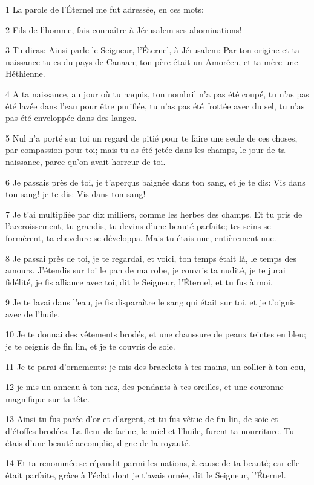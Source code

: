 \par 1 La parole de l'Éternel me fut adressée, en ces mots:
\par 2 Fils de l'homme, fais connaître à Jérusalem ses abominations!
\par 3 Tu diras: Ainsi parle le Seigneur, l'Éternel, à Jérusalem: Par ton origine et ta naissance tu es du pays de Canaan; ton père était un Amoréen, et ta mère une Héthienne.
\par 4 A ta naissance, au jour où tu naquis, ton nombril n'a pas été coupé, tu n'as pas été lavée dans l'eau pour être purifiée, tu n'as pas été frottée avec du sel, tu n'as pas été enveloppée dans des langes.
\par 5 Nul n'a porté sur toi un regard de pitié pour te faire une seule de ces choses, par compassion pour toi; mais tu as été jetée dans les champs, le jour de ta naissance, parce qu'on avait horreur de toi.
\par 6 Je passais près de toi, je t'aperçus baignée dans ton sang, et je te dis: Vis dans ton sang! je te dis: Vis dans ton sang!
\par 7 Je t'ai multipliée par dix milliers, comme les herbes des champs. Et tu pris de l'accroissement, tu grandis, tu devins d'une beauté parfaite; tes seins se formèrent, ta chevelure se développa. Mais tu étais nue, entièrement nue.
\par 8 Je passai près de toi, je te regardai, et voici, ton temps était là, le temps des amours. J'étendis sur toi le pan de ma robe, je couvris ta nudité, je te jurai fidélité, je fis alliance avec toi, dit le Seigneur, l'Éternel, et tu fus à moi.
\par 9 Je te lavai dans l'eau, je fis disparaître le sang qui était sur toi, et je t'oignis avec de l'huile.
\par 10 Je te donnai des vêtements brodés, et une chaussure de peaux teintes en bleu; je te ceignis de fin lin, et je te couvris de soie.
\par 11 Je te parai d'ornements: je mis des bracelets à tes mains, un collier à ton cou,
\par 12 je mis un anneau à ton nez, des pendants à tes oreilles, et une couronne magnifique sur ta tête.
\par 13 Ainsi tu fus parée d'or et d'argent, et tu fus vêtue de fin lin, de soie et d'étoffes brodées. La fleur de farine, le miel et l'huile, furent ta nourriture. Tu étais d'une beauté accomplie, digne de la royauté.
\par 14 Et ta renommée se répandit parmi les nations, à cause de ta beauté; car elle était parfaite, grâce à l'éclat dont je t'avais ornée, dit le Seigneur, l'Éternel.
